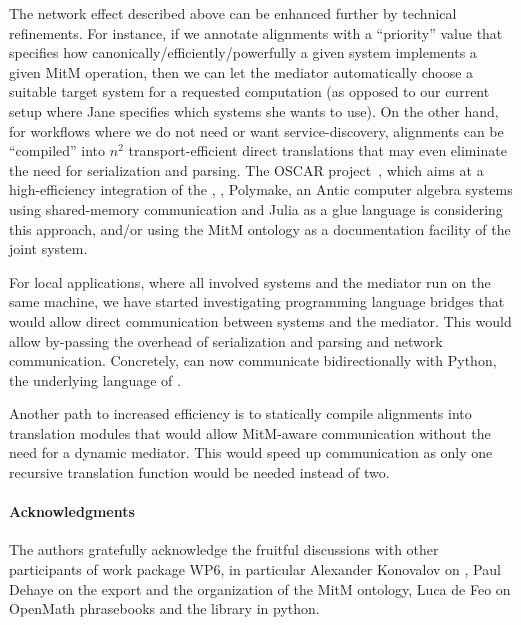 The network effect described above can be enhanced further by technical refinements.
For instance, if we annotate alignments with a ``priority'' value that specifies how canonically/efficiently/powerfully a given system implements a given MitM operation, then we can let the \MMT mediator automatically choose a suitable target system for a requested computation (as opposed to our current setup where Jane specifies which systems she wants to use).
On the other hand, for workflows where we do not need or want service-discovery, alignments can be ``compiled'' into $n^2$ transport-efficient direct translations that may even eliminate the need for serialization and parsing.
The OSCAR project~\cite{OSCAR:on}, which aims at a high-efficiency integration of the \GAP, \Singular, Polymake, an Antic computer algebra systems using shared-memory communication and Julia as a glue language is considering this approach, and/or using the MitM ontology as a documentation facility of the joint system. 

For local applications, where all involved systems and the mediator run on the same machine, we have started investigating programming language bridges that would allow direct communication between systems and the \MMT mediator.
This would allow by-passing the overhead of serialization and parsing and network communication.
Concretely, \MMT can now communicate bidirectionally with Python, the underlying language of \Sage.

Another path to increased efficiency is to statically compile alignments into translation modules that would allow MitM-aware communication without the need for a dynamic mediator.
This would speed up communication as only one recursive translation function would be needed instead of two.

\paragraph*{Acknowledgments}
The authors gratefully acknowledge the fruitful discussions with other participants of
work package WP6, in particular Alexander Konovalov on \SCSCP, Paul Dehaye on the \Sage
export and the organization of the MitM ontology, Luca de Feo on OpenMath phrasebooks
and the \SCSCP library in python.



